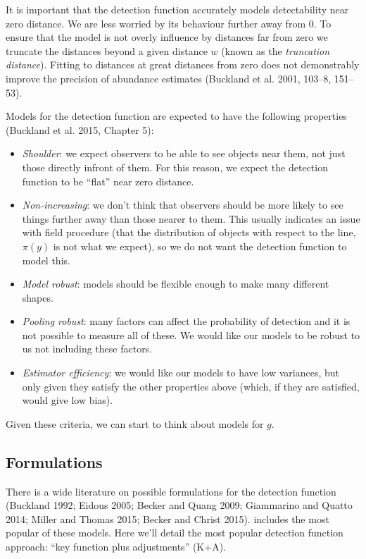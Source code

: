 \documentclass[article]{jss}
\begin{document}
It is important that the detection function accurately models
detectability near zero distance. We are less worried by its behaviour
further away from 0. To ensure that the model is not overly influence by
distances far from zero we truncate the distances beyond a given
distance \(w\) (known as the \emph{truncation distance}). Fitting to
distances at great distances from zero does not demonstrably improve the
precision of abundance estimates (Buckland et al. 2001, 103--8,
151--53).

Models for the detection function are expected to have the following
properties (Buckland et al. 2015, Chapter 5):

\begin{itemize}
\itemsep1pt\parskip0pt
\item
  \emph{Shoulder}: we expect observers to be able to see objects near
  them, not just those directly infront of them. For this reason, we
  expect the detection function to be ``flat'' near zero distance.
\item
  \emph{Non-increasing}: we don't think that observers should be more
  likely to see things further away than those nearer to them. This
  usually indicates an issue with field procedure (that the distribution
  of objects with respect to the line, \(\pi(y)\) is not what we
  expect), so we do not want the detection function to model this.
\item
  \emph{Model robust}: models should be flexible enough to make many
  different shapes.
\item
  \emph{Pooling robust}: many factors can affect the probability of
  detection and it is not possible to measure all of these. We would
  like our models to be robust to us not including these factors.
\item
  \emph{Estimator efficiency}: we would like our models to have low
  variances, but only given they satisfy the other properties above
  (which, if they are satisfied, would give low bias).
\end{itemize}

Given these criteria, we can start to think about models for \(g\).

\subsection{Formulations}\label{formulations}

There is a wide literature on possible formulations for the detection
function (Buckland 1992; Eidous 2005; Becker and Quang 2009; Giammarino
and Quatto 2014; Miller and Thomas 2015; Becker and Christ 2015).
 includes the most popular of these models. Here we'll
detail the most popular detection function approach: ``key function plus
adjustments'' (K+A).
\end{document}
